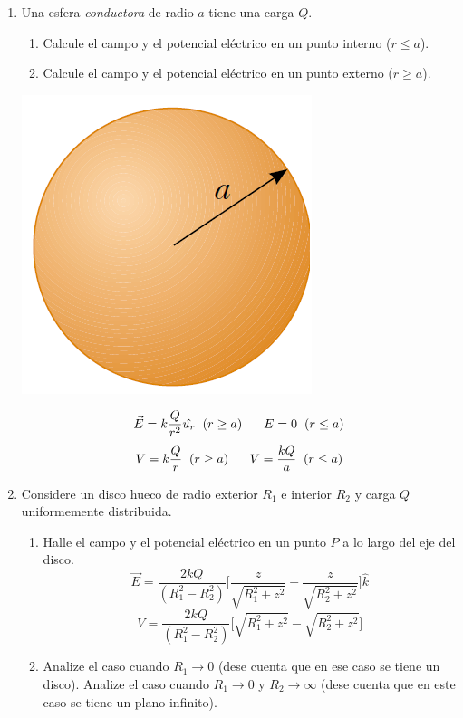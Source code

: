 \documentclass[11pt,twocolumn]{article}
\begin{document}
\begin{enumerate}
\item Una esfera \textit{conductora} de radio $a$ tiene una carga $Q$. 
\begin{enumerate}
\item Calcule el campo y el potencial eléctrico en un punto interno ($r\leq a$).  
\item Calcule el campo y el potencial eléctrico en un punto externo ($r\geq a$).  
\end{enumerate}
{
\begin{center}
\includegraphics[scale=0.2]{esfera}
\end{center}
}
\begin{displaymath}
\vec{E}=k\dfrac{Q}{r^2}\hat{u_{r}} \hspace{0.2 cm} (r \geq a) \hspace{0.6 cm} E=0 \hspace{0.2 cm} (r \leq a)
\end{displaymath}
\begin{displaymath}
V=k\dfrac{Q}{r} \hspace{0.2 cm} (r\geq a) \hspace{0.6 cm} V=\dfrac{kQ}{a} \hspace{0.2 cm} (r\leq a)
\end{displaymath}

\item Considere un disco hueco de radio exterior $R_{1}$ e interior $R_{2}$ y carga $Q$ uniformemente distribuida. 
\begin{enumerate}
\item Halle el campo y el potencial eléctrico en un punto $P$ a lo largo del eje del disco.
\begin{displaymath}
\vec{E}=\dfrac{2kQ}{(R_{1}^2 -R_{2}^2)}\Big[\dfrac{z}{\sqrt{R_{1}^2 +z^2}}- \dfrac{z}{\sqrt{R_{2}^2 +z^2}}\Big]\hat{k}
\end{displaymath}
\begin{displaymath}
V= \dfrac{2kQ}{(R_{1}^2 -R_{2}^2)}\Big[\sqrt{R_{1}^2 + z^2} - \sqrt{R_{2}^2 +z^2}\Big]
\end{displaymath}
\item Analize el caso cuando $R_{1} \to 0$ (dese cuenta que en ese caso se tiene un disco). Analize el caso cuando $R_{1} \to 0$ y $R_{2} \to \infty $ (dese cuenta que en este caso se tiene un plano infinito).
\end{enumerate}


\end{enumerate}
\end{document}
